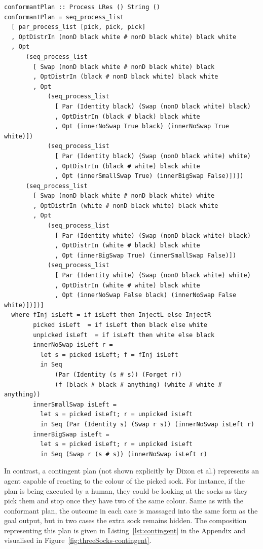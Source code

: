 \documentclass[class=smolathesis,crop=false]{standalone}
\begin{document}
\begin{lstlisting}[label=lst:conformant,caption=Conformant plan using our framework,basicstyle=\footnotesize\ttfamily,columns=flexible,breaklines=true]
conformantPlan :: Process LRes () String ()
conformantPlan = seq_process_list
  [ par_process_list [pick, pick, pick]
  , OptDistrIn (nonD black white # nonD black white) black white
  , Opt
      (seq_process_list
        [ Swap (nonD black white # nonD black white) black
        , OptDistrIn (black # nonD black white) black white
        , Opt
            (seq_process_list
              [ Par (Identity black) (Swap (nonD black white) black)
              , OptDistrIn (black # black) black white
              , Opt (innerNoSwap True black) (innerNoSwap True white)])
            (seq_process_list
              [ Par (Identity black) (Swap (nonD black white) white)
              , OptDistrIn (black # white) black white
              , Opt (innerSmallSwap True) (innerBigSwap False)])])
      (seq_process_list
        [ Swap (nonD black white # nonD black white) white
        , OptDistrIn (white # nonD black white) black white
        , Opt
            (seq_process_list
              [ Par (Identity white) (Swap (nonD black white) black)
              , OptDistrIn (white # black) black white
              , Opt (innerBigSwap True) (innerSmallSwap False)])
            (seq_process_list
              [ Par (Identity white) (Swap (nonD black white) white)
              , OptDistrIn (white # white) black white
              , Opt (innerNoSwap False black) (innerNoSwap False white)])])]
  where fInj isLeft = if isLeft then InjectL else InjectR
        picked isLeft  = if isLeft then black else white
        unpicked isLeft  = if isLeft then white else black
        innerNoSwap isLeft r =
          let s = picked isLeft; f = fInj isLeft
          in Seq
              (Par (Identity (s # s)) (Forget r))
              (f (black # black # anything) (white # white # anything))
        innerSmallSwap isLeft =
          let s = picked isLeft; r = unpicked isLeft
          in Seq (Par (Identity s) (Swap r s)) (innerNoSwap isLeft r)
        innerBigSwap isLeft =
          let s = picked isLeft; r = unpicked isLeft
          in Seq (Swap r (s # s)) (innerNoSwap isLeft r)
\end{lstlisting}

In contrast, a contingent plan (not shown explicitly by Dixon et al.) represents an agent capable of reacting to the colour of the picked sock.
For instance, if the plan is being executed by a human, they could be looking at the socks as they pick them and stop once they have two of the same colour.
Same as with the conformant plan, the outcome in each case is massaged into the same form as the goal output, but in two cases the extra sock remains hidden.
The composition representing this plan is given in Listing~\ref{lst:contingent} in the Appendix and visualised in Figure~\ref{fig:threeSocks-contingent}.
\cbend
\end{document}
